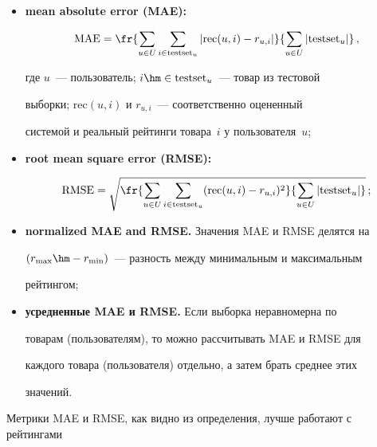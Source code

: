 \begin{itemize}





    \item \textbf{mean absolute error (MAE):}


    $$


\mathrm{MAE}=\fr{\sum\limits_{u\in U}\sum\limits_{i\in \mathrm{testset}_u}|\mathrm{rec}(u,i)-r_{u,i}|}


{\sum\limits_{u \in U}|\mathrm{testset}_u|}\,,


$$ 


где $u$~--- пользователь; $i\hm\in \mathrm{testset}_u$~--- товар из тестовой


выборки; $\mathrm{rec}(u,i)$ и $r_{u,i}$~--- соответственно оцененный


системой и реальный рейтинги товара~$i$ у пользователя~$u$;





\item \textbf{root mean square error (RMSE):}


$$


\mathrm{RMSE}=\sqrt{\fr{\sum\limits_{u\in U}\sum\limits_{i\in \mathrm{testset}_u}(\mathrm{rec}(u,i)-r_{u,i})^2}


{\sum\limits_{u \in U}|\mathrm{testset}_u|}}\,;


$$





\item \textbf{normalized MAE and RMSE.} Значения MAE и RMSE делятся на


$(r_{\max}\hm-r_{\min})$~--- разность между минимальным и максимальным


рейтингом;





\item \textbf{усредненные MAE и RMSE.} Если выборка неравномерна по


товарам (пользователям), то можно рассчитывать MAE и RMSE для


каждого товара (пользователя) отдельно, а затем брать среднее этих


значений.


\end{itemize}





Метрики MAE и RMSE, как видно из определения, лучше работают с рейтингами


